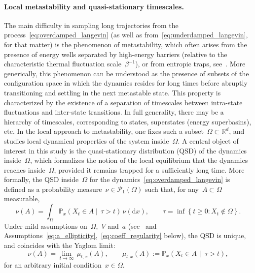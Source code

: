 \documentclass[a4]{article}
\renewcommand{\d}{\mathrm{d}}
\renewcommand{\P}{\mathbb{P}}
\newcommand{\R}{\mathbb{R}}
\newcommand{\1}{\mathbbm 1}
\begin{document}
    \paragraph{Local metastability and quasi-stationary timescales.}
    The main difficulty in sampling long trajectories from the process~\eqref{eq:overdamped_langevin} (as well as from~\eqref{eq:underdamped_langevin}, for that matter) is the phenomenon of metastability, which often arises from the presence of energy wells separated by high-energy barriers (relative to the characteristic thermal fluctuation scale~$\beta^{-1}$), or from entropic traps, see~\cite[Section 1.2.3]{LS16}.
    More generically, this phenomenon can be understood as the presence of subsets of the configuration space in which the dynamics resides for long times before abruptly transitioning and settling in the next metastable state.
    This property is characterized by the    existence of a separation of timescales between intra-state fluctuations and inter-state transitions. In full generality, there may be a hierarchy of timescales, corresponding to states, superstates (energy superbasins), etc.
    In the local approach to metastability, one fixes such a subset~$\Omega\subset\R^d$, and studies local dynamical properties of the system inside~$\Omega$.
    A central object of interest in this study is the quasi-stationary distribution (QSD) of the dynamics inside~$\Omega$, which formalizes the notion of the local equilibrium that the dynamics reaches inside~$\Omega$, provided it remains trapped for a sufficiently long time.
    More formally, the QSD inside~$\Omega$ for the dynamics~\eqref{eq:overdamped_langevin} is defined as a probability measure~$\nu \in \mathcal P_1(\Omega)$ such that, for any~$A\subset \Omega$ measurable,
    \begin{equation}
        \label{eq:qsd}
        \nu(A) = \int_\Omega \mathbb P_x\left(X_t\in A\middle|\,\tau>t\right)\, \nu(\d x),\qquad \tau = \inf\left\{t\geq 0: X_t\not\in \Omega\right\}.
    \end{equation}
    Under mild assumptions on~$\Omega$,~$V$ and~$a$ (see~\cite{LBLLP12} and Assumptions~\eqref{eq:a_ellipticity},~\eqref{eq:coeff_regularity} below), the QSD is unique, and coincides with the Yaglom limit:
    \begin{equation}
        \label{eq:yaglom_limit}
        \nu(A) =\underset{t\to\infty}{\lim}\,\mu_{t,x}(A),\qquad \mu_{t,x}(A) := \P_x\left(X_t\in A\,\middle|\,\tau >t\right),
    \end{equation}
    for an arbitrary initial condition~$x\in \Omega$.
\end{document}
